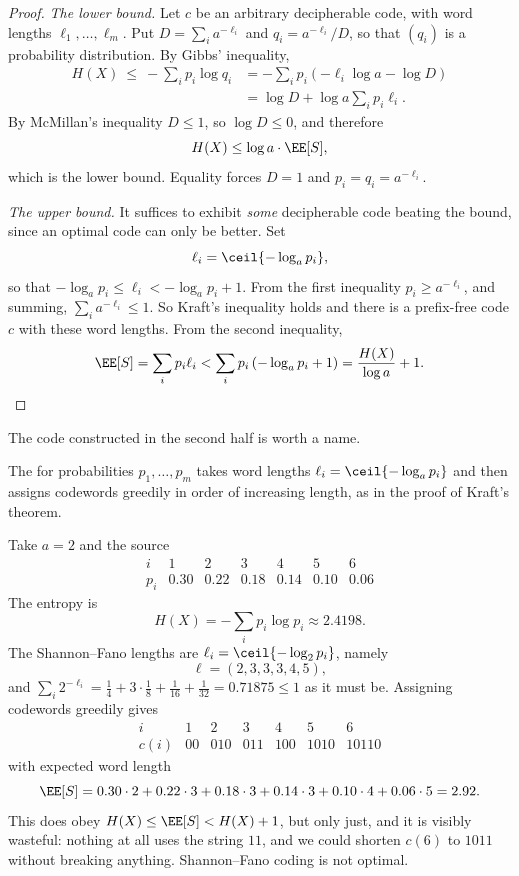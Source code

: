 \begin{proof}
	\emph{The lower bound.} Let $c$ be an arbitrary decipherable code, with word lengths $\ell_1, \dots, \ell_m$. Put $D = \sum_i a^{-\ell_i}$ and $q_i = a^{-\ell_i}/D$, so that $(q_i)$ is a probability distribution. By Gibbs' inequality,
	\begin{align*}
		H(X) \ \le\  -\sum_i p_i \log q_i &= -\sum_i p_i\left(-\ell_i \log a - \log D\right)\\
		&= \log D + \log a \sum_i p_i \ell_i.
	\end{align*}
	By McMillan's inequality $D \le 1$, so $\log D \le 0$, and therefore
	$$H(X) \le \log a \cdot \EE[S],$$
	which is the lower bound. Equality forces $D = 1$ and $p_i = q_i = a^{-\ell_i}$.

	\emph{The upper bound.} It suffices to exhibit \emph{some} decipherable code beating the bound, since an optimal code can only be better. Set
	$$\ell_i = \ceil{-\log_a p_i},$$
	so that $-\log_a p_i \le \ell_i < -\log_a p_i + 1$. From the first inequality $p_i \ge a^{-\ell_i}$, and summing, $\sum_i a^{-\ell_i} \le 1$. So Kraft's inequality holds and there is a prefix-free code $c$ with these word lengths. From the second inequality,
	$$\EE[S] = \sum_i p_i \ell_i < \sum_i p_i \left(-\log_a p_i + 1\right) = \frac{H(X)}{\log a} + 1. \qedhere$$
\end{proof}

The code constructed in the second half is worth a name.

\begin{definition}
	The  for probabilities $p_1, \dots, p_m$ takes word lengths $\ell_i = \ceil{-\log_a p_i}$ and then assigns codewords greedily in order of increasing length, as in the proof of Kraft's theorem.
\end{definition}

\begin{example}\label{ex:shannonfano}
	Take $a = 2$ and the source
	$$\begin{array}{c|cccccc}
		i & 1 & 2 & 3 & 4 & 5 & 6 \\ \hline
		p_i & 0.30 & 0.22 & 0.18 & 0.14 & 0.10 & 0.06
	\end{array}$$
	The entropy is
	$$H(X) = -\sum_i p_i \log p_i \approx 2.4198.$$
	The Shannon--Fano lengths are $\ell_i = \ceil{-\log_2 p_i}$, namely
	$$\ell = (2,3,3,3,4,5),$$
	and $\sum_i 2^{-\ell_i} = \tfrac14 + 3\cdot\tfrac18 + \tfrac1{16}+\tfrac1{32} = 0.71875 \le 1$ as it must be. Assigning codewords greedily gives
	$$\begin{array}{c|cccccc}
		i & 1 & 2 & 3 & 4 & 5 & 6 \\ \hline
		c(i) & 00 & 010 & 011 & 100 & 1010 & 10110
	\end{array}$$
	with expected word length
	$$\EE[S] = 0.30\cdot 2 + 0.22 \cdot 3 + 0.18 \cdot 3 + 0.14\cdot 3 + 0.10\cdot 4 + 0.06\cdot 5 = 2.92.$$
	This does obey $H(X) \le \EE[S] < H(X)+1$, but only just, and it is visibly wasteful: nothing at all uses the string $11$, and we could shorten $c(6)$ to $1011$ without breaking anything. Shannon--Fano coding is not optimal.
\end{example}

